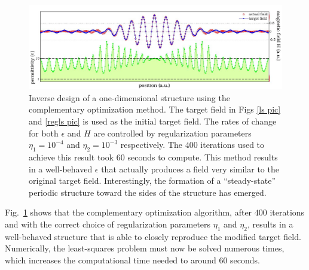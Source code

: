 \begin{figure}[htbp]\centering
\includegraphics[width=\textwidth]{p1/complementary}
\caption{Inverse design of a one-dimensional structure using the complementary optimization method. The target field in Figs \ref{ls pic} and \ref{regls pic} is used as the initial target field. The rates of change for both $\epsilon$ and $H$ are controlled by regularization parameters $\eta_1=10^{-4}$ and $\eta_2=10^{-3}$ respectively. The $400$ iterations used to achieve this result took $60$ seconds to compute. This method results in a well-behaved $\epsilon$ that actually produces a field very similar to the original target field. Interestingly, the formation of a ``steady-state'' periodic structure toward the sides of the structure has emerged.}
\label{comp pic}
\end{figure}

Fig.~\ref{comp pic} shows that the complementary optimization algorithm, after $400$ iterations and with the correct choice of regularization parameters $\eta_1$ and $\eta_2$, results in a well-behaved structure that is able to closely reproduce the modified target field. Numerically, the least-squares problem must now be solved numerous times, which increases the computational time needed to around $60$ seconds. 

